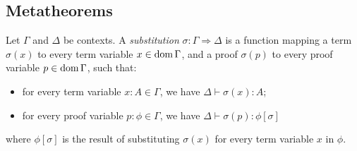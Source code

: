 \subsection{Metatheorems}

Let $\Gamma$ and $\Delta$ be contexts.  A \emph{substitution} $\sigma : \Gamma \Rightarrow \Delta$
is a function mapping a term $\sigma(x)$ to every term variable $x \in \operatorname{dom} \Gamma$, and a proof $\sigma(p)$ to
every proof variable $p \in \operatorname{dom} \Gamma$, such that:
\begin{itemize}
\item
for every term variable $x : A \in \Gamma$, we have $\Delta \vdash \sigma(x) : A$;
\item
for every proof variable $p : \phi \in \Gamma$, we have $\Delta \vdash \sigma(p) : \phi [ \sigma ]$
\end{itemize}
where $\phi [ \sigma ]$ is the result of substituting $\sigma(x)$ for every term variable $x$ in $\phi$.

\begin{code}%
\>  \AgdaSymbol{:}  \AgdaSymbol{\{}\AgdaSymbol{\}} \AgdaSymbol{\{}\AgdaSymbol{\}}            \<%
\end{code}

